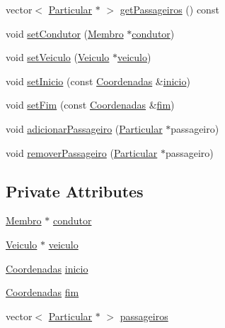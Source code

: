 \begin{DoxyCompactItemize}
\item 
vector$<$ \hyperlink{class_particular}{Particular} $\ast$ $>$ \hyperlink{class_viagem_ae54ff1f2f306bf164e5c90e5cf254a05}{get\+Passageiros} () const 
\item 
void \hyperlink{class_viagem_a2f4fa33d3da68b08681ef35c45bb8e9a}{set\+Condutor} (\hyperlink{class_membro}{Membro} $\ast$\hyperlink{class_viagem_a015bb952a7afce6a348d0a9f88bdaf5c}{condutor})
\item 
void \hyperlink{class_viagem_aa3f5672a7a99fbc78dbf5987fcc05688}{set\+Veiculo} (\hyperlink{class_veiculo}{Veiculo} $\ast$\hyperlink{class_viagem_aee9386a44de6b6afb11faff59331f7b5}{veiculo})
\item 
void \hyperlink{class_viagem_a1123f1c35e2ce003bed4ccfa990ed241}{set\+Inicio} (const \hyperlink{class_coordenadas}{Coordenadas} \&\hyperlink{class_viagem_a0a871b6782ab9b478a530f2c15dc1e32}{inicio})
\item 
void \hyperlink{class_viagem_a6adcbdb92a4470979538f9566f718ff4}{set\+Fim} (const \hyperlink{class_coordenadas}{Coordenadas} \&\hyperlink{class_viagem_ab54e61d41be0157f9e75b14c8e06137f}{fim})
\item 
void \hyperlink{class_viagem_abaf8627f31b45be041716e8bf653968a}{adicionar\+Passageiro} (\hyperlink{class_particular}{Particular} $\ast$passageiro)
\item 
void \hyperlink{class_viagem_a43c491291e4639dc64ac1016ab7f3157}{remover\+Passageiro} (\hyperlink{class_particular}{Particular} $\ast$passageiro)
\end{DoxyCompactItemize}
\subsection*{Private Attributes}
\begin{DoxyCompactItemize}
\item 
\hyperlink{class_membro}{Membro} $\ast$ \hyperlink{class_viagem_a015bb952a7afce6a348d0a9f88bdaf5c}{condutor}
\item 
\hyperlink{class_veiculo}{Veiculo} $\ast$ \hyperlink{class_viagem_aee9386a44de6b6afb11faff59331f7b5}{veiculo}
\item 
\hyperlink{class_coordenadas}{Coordenadas} \hyperlink{class_viagem_a0a871b6782ab9b478a530f2c15dc1e32}{inicio}
\item 
\hyperlink{class_coordenadas}{Coordenadas} \hyperlink{class_viagem_ab54e61d41be0157f9e75b14c8e06137f}{fim}
\item 
vector$<$ \hyperlink{class_particular}{Particular} $\ast$ $>$ \hyperlink{class_viagem_a8417361a46610f9fbbd6a7c43b02c149}{passageiros}
\end{DoxyCompactItemize}



